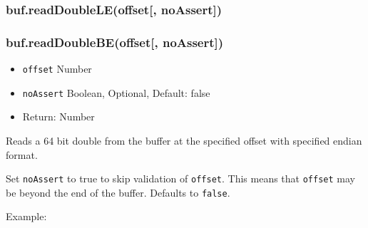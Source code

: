\begin{Shaded}
\begin{Highlighting}[]
  \NormalTok{(}\NormalTok{);}

\NormalTok{buf[}\NormalTok{] = }\NormalTok{;}
\NormalTok{buf[}\NormalTok{] = }\NormalTok{;}
\NormalTok{buf[}\NormalTok{] = }\NormalTok{;}
\NormalTok{buf[}\NormalTok{] = }\NormalTok{;}

\NormalTok{(}\NormalTok{(}\NormalTok{));}

\end{Highlighting}
\end{Shaded}

\subsubsection{buf.readDoubleLE(offset{[},
noAssert{]})}\label{buf.readdoubleleoffset-noassert}

\subsubsection{buf.readDoubleBE(offset{[},
noAssert{]})}\label{buf.readdoublebeoffset-noassert}

\begin{itemize}
\itemsep1pt\parskip0pt
\item
  \texttt{offset} Number
\item
  \texttt{noAssert} Boolean, Optional, Default: false
\item
  Return: Number
\end{itemize}

Reads a 64 bit double from the buffer at the specified offset with
specified endian format.

Set \texttt{noAssert} to true to skip validation of \texttt{offset}.
This means that \texttt{offset} may be beyond the end of the buffer.
Defaults to \texttt{false}.

Example:

